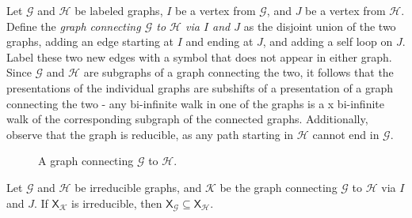 \documentclass{article}
\newcommand{\Gc}{\mathcal{G}}  %
\newcommand{\Hc}{\mathcal{H}}  %
\newcommand{\Kc}{\mathcal{K}}
\newcommand{\shift}[1]{\mathsf{X}_{#1}}
\newcommand{\term}[1]{\textit{#1}}
\theoremstyle{definition}
\begin{document}
    Let \(\Gc\) and \(\Hc\) be labeled graphs, \(I\) be a vertex from \(\Gc\), and \(J\) 
    be a vertex from \(\Hc\). Define the \term{graph connecting \(\Gc\) to \(\Hc\) via \(I\) and \(J\)} 
    as the disjoint union of the two graphs, adding an edge starting at \(I\) and ending at \(J\), 
    and adding a self loop on \(J\). Label these two new edges with a symbol that 
    does not appear in either graph. 
    Since \(\Gc\) and \(\Hc\) are subgraphs of a graph connecting the two,
    it follows that the presentations of the individual graphs are subshifts of a presentation 
    of a graph connecting the two - any bi-infinite walk in one of the graphs is a x
    bi-infinite walk of the corresponding subgraph of the connected graphs.
    Additionally, observe that the graph is reducible,
    as any path starting in \(\Hc\) cannot end in \(\Gc\).
    

    \begin{figure}[ht]
        \centering

        \caption{A graph connecting \(\Gc\) to \(\Hc\).}
    \end{figure}

    \begin{theorem}
        Let \(\Gc\) and \(\Hc\) be irreducible graphs, and \(\Kc\) be the graph connecting 
        \(\Gc\) to \(\Hc\) via \(I\) and \(J\).
        If \(\shift{\Kc}\) is irreducible, then
        \(\shift{\Gc} \subseteq \shift{\Hc}\).
    \end{theorem}
\end{document}
